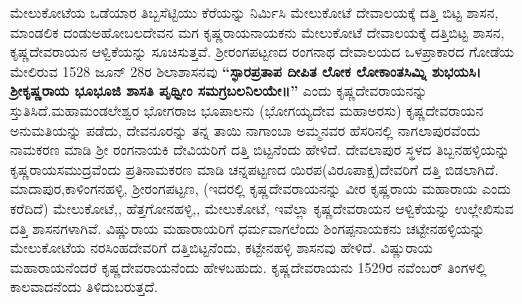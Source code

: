 ಮೇಲುಕೋಟೆಯ ಒಡೆಯಾರ ತಿಬ್ಬಸೆಟ್ಟಿಯು ಕೆರೆಯನ್ನು ನಿರ್ಮಿಸಿ ಮೇಲುಕೋಟೆ ದೇವಾಲಯಕ್ಕೆ ದತ್ತಿ ಬಿಟ್ಟ ಶಾಸನ, ಮಾಂಡಲಿಕ ದಂಡುಅಹೋಬಲದೇವನ ಮಗ ಕೃಷ್ಣರಾಯನಾಯಕನು ಮೇಲುಕೋಟೆ ದೇವಾಲಯಕ್ಕೆ ದತ್ತಿಬಿಟ್ಟ ಶಾಸನ, ಕೃಷ್ಣದೇವರಾಯನ ಆಳ್ವಿಕೆಯನ್ನು ಸೂಚಿಸುತ್ತವೆ. ಶ‍್ರೀರಂಗಪಟ್ಟಣದ ರಂಗನಾಥ ದೇವಾಲಯದ ಒಳಪ್ರಾಕಾರದ ಗೋಡೆಯ ಮೇಲಿರುವ 1528 ಜೂನ್​ 28ರ ಶಿಲಾಶಾಸನವು \textbf{“ಸ್ಫಾರಪ್ರತಾಪ ದೀಪಿತ ಲೋಕ ಲೋಕಾಂತಸಿಮ್ನಿ ಶುಭಯಸಿ। ಶ‍್ರೀಕೃಷ್ಣರಾಯ ಭೂಭೂಜಿ ಶಾಸತಿ ಪೃಥ್ವೀಂ ಸಮಗ್ರಬಲನಿಲಯೇ॥”} ಎಂದು ಕೃಷ್ಣದೇವರಾಯನನ್ನು ಸ್ತುತಿಸಿದೆ.\break ಮಹಾಮಂಡಲೇಶ್ವರ ಭೋಗರಾಜ ಭೂಪಾಲನು (ಭೋಗಯ್ಯದೇವ ಮಹಾಅರಸು) ಕೃಷ್ಣದೇವರಾಯನ ಅನುಮತಿಯನ್ನು ಪಡೆದು, ದೇವನೂರನ್ನು ತನ್ನ ತಾಯಿ ನಾಗಾಂಬಾ ಅಮ್ಮನವರ ಹೆಸರಿನಲ್ಲಿ ನಾಗಲಾಪುರವೆಂದು ನಾಮಕರಣ ಮಾಡಿ ಶ‍್ರೀ ರಂಗನಾಯಕಿ ದೇವಿಯರಿಗೆ ದತ್ತಿ ಬಿಟ್ಟನೆಂದು ಹೇಳಿದೆ. ದೇವಲಾಪುರ ಸ್ಥಳದ ತಿಬ್ಬನಹಳ್ಳಿಯನ್ನು ಕೃಷ್ಣರಾಯಸಮುದ್ರವೆಂದು ಪ್ರತಿನಾಮಕರಣ ಮಾಡಿ ಚನ್ನಪಟ್ಟಣದ ಯಿರಪ(ವಿರೂಪಾಕ್ಷ)ದೇವರಿಗೆ ದತ್ತಿ ಬಿಡಲಾಗಿದೆ. ಮಾದಾಪುರ,\break ಕಾಳಿಂಗನಹಳ್ಳಿ, ಶ‍್ರೀರಂಗಪಟ್ಟಣ, (ಇದರಲ್ಲಿ ಕೃಷ್ಣದೇವರಾಯನನ್ನು ವೀರ ಕೃಷ್ಣರಾಯ ಮಹಾರಾಯ ಎಂದು ಕರೆದಿದೆ) ಮೇಲುಕೋಟೆ,, ಹೆತ್ತಗೋನಹಳ್ಳಿ,, ಮೇಲುಕೋಟೆ, ಇವೆಲ್ಲಾ ಕೃಷ್ಣದೇವರಾಯನ ಆಳ್ವಿಕೆಯನ್ನು ಉಲ್ಲೇಖಿ\-ಸುವ ದತ್ತಿ ಶಾಸನಗಳಾಗಿವೆ. ವಿಷ್ಣುರಾಯ ಮಹಾರಾಯರಿಗೆ ಧರ್ಮವಾಗಲೆಂದು ಶಿಂಗಪ್ಪನಾಯಕನು ಚಟ್ಟೇನಹಳ್ಳಿಯನ್ನು ಮೇಲುಕೋಟೆಯ ನರಸಿಂಹದೇವರಿಗೆ ದತ್ತಿಬಿಟ್ಟ\-ನೆಂದು, ಕಟ್ಟೇನಹಳ್ಳಿ ಶಾಸನವು ಹೇಳಿದೆ. ವಿಷ್ಣುರಾಯ ಮಹಾರಾಯ\-ನೆಂದರೆ ಕೃಷ್ಣದೇವರಾಯನೆಂದು ಹೇಳಬಹುದು. ಕೃಷ್ಣದೇವರಾಯನು 1529ರ ನವೆಂಬರ್​ ತಿಂಗಳಲ್ಲಿ ಕಾಲವಾದನೆಂದು ತಿಳಿದುಬರುತ್ತದೆ.

